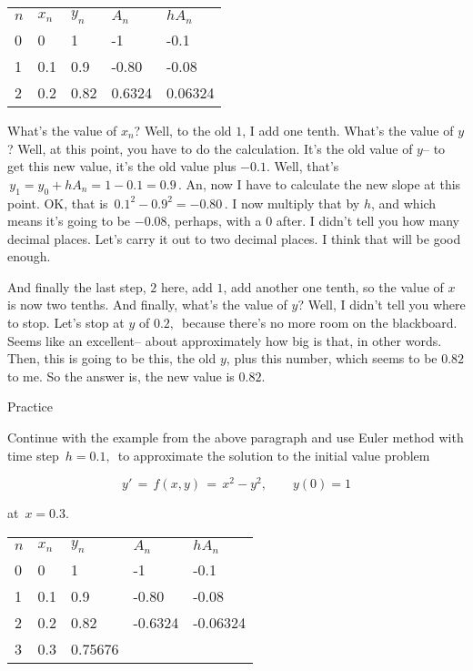 \begin{table}[ht!]
  \centering
  \begin{tabular}{lllll}
    $n$ & $x_n$ & $y_n$ & $A_n$ & $h A_n$ \\
    0  & 0     & 1     &  -1   &  -0.1    \\
    1  & 0.1   & 0.9   & -0.80 &  -0.08   \\
    2  & 0.2   & 0.82  & 0.6324&  0.06324 \\ 
  \end{tabular}
\end{table}

What's the value of $x _n$?
Well, to the old $1$, I add one tenth.
What's the value of $y$?
Well, at this point, you have to do the calculation.
It's the old value of $y$--
to get this new value, it's the old value plus $-0.1$.
Well, that's $\,y_{1} = y_{0} + h A_n  = 1 - 0.1 = 0.9 \,$.
An, now I have to calculate the new slope at this point.
OK, that is $\, 0.1^2 - 0.9^2 = -0.80 \,$. 
I now multiply that by $h$, and which
means it's going to be $- 0.08$, perhaps, with a $0$ after.
I didn't tell you how many decimal places.
Let's carry it out to two decimal places.
I think that will be good enough.

And finally the last step, $2$ here,
add $1$, add another one tenth, so the value of $x$ is now two tenths.
And finally, what's the value of $y$?
Well, I didn't tell you where to stop.
Let's stop at $y$ of $0.2,\,$ because there's no more room on the blackboard.
Seems like an excellent--
about approximately how big is that, in other words.
Then, this is going to be this, the old $y$,
plus this number, which seems to be $0.82$ to me.
So the answer is, the new value is $0.82$.

\clearpage

\begin{exercise}
  Practice
\end{exercise}

Continue with the example from the above paragraph
and use Euler method with time step $\, h=0.1, \,$ to approximate the solution
to the initial value problem

\begin{equation*}
  y'\, =\, f(x,y)\, =\, x^2-y^2, \qquad y(0)=1
\end{equation*}

at $\, x = 0.3 $.

\begin{table}[ht!]
  \centering
  \begin{tabular}{lllll}
    $n$ & $x_n$ & $y_n$ & $A_n$ & $h A_n$ \\
    0  & 0     & 1     &  -1   &  -0.1    \\
    1  & 0.1   & 0.9   & -0.80 &  -0.08   \\
    2  & 0.2   & 0.82  & -0.6324&  -0.06324 \\
    3  & 0.3   & 0.75676  &  &   
  \end{tabular}
\end{table}

